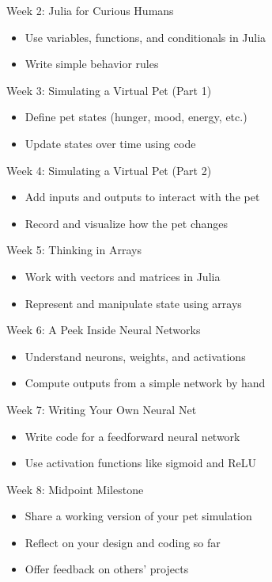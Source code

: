 \documentclass[10pt]{book}
\begin{document}
Week 2: Julia for Curious Humans
\begin{itemize}
  \item Use variables, functions, and conditionals in Julia
  \item Write simple behavior rules
\end{itemize}

Week 3: Simulating a Virtual Pet (Part 1)
\begin{itemize}
  \item Define pet states (hunger, mood, energy, etc.)
  \item Update states over time using code
\end{itemize}

Week 4: Simulating a Virtual Pet (Part 2)
\begin{itemize}
  \item Add inputs and outputs to interact with the pet
  \item Record and visualize how the pet changes
\end{itemize}

Week 5: Thinking in Arrays
\begin{itemize}
  \item Work with vectors and matrices in Julia
  \item Represent and manipulate state using arrays
\end{itemize}

Week 6: A Peek Inside Neural Networks
\begin{itemize}
  \item Understand neurons, weights, and activations
  \item Compute outputs from a simple network by hand
\end{itemize}

Week 7: Writing Your Own Neural Net
\begin{itemize}
  \item Write code for a feedforward neural network
  \item Use activation functions like sigmoid and ReLU
\end{itemize}

Week 8: Midpoint Milestone
\begin{itemize}
  \item Share a working version of your pet simulation
  \item Reflect on your design and coding so far
  \item Offer feedback on others' projects
\end{itemize}
\end{document}
